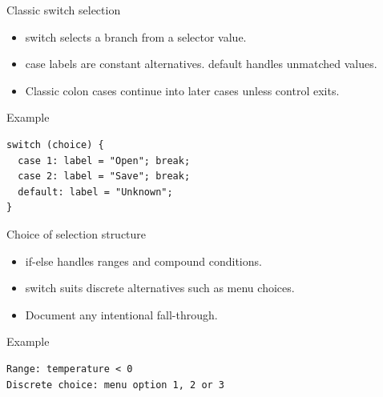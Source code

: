 \documentclass[10pt,aspectratio=169]{beamer}
\begin{document}
\begin{frame}[fragile,t]{Classic switch selection}
\begin{itemize}
\item switch selects a branch from a selector value.
\item case labels are constant alternatives. default handles unmatched values.
\item Classic colon cases continue into later cases unless control exits.
\end{itemize}
\vspace{1mm}\begin{block}{Example}
\begin{lstlisting}
switch (choice) {
  case 1: label = "Open"; break;
  case 2: label = "Save"; break;
  default: label = "Unknown";
}
\end{lstlisting}
\end{block}
\end{frame}

\begin{frame}[fragile,t]{Choice of selection structure}
\begin{itemize}
\item if-else handles ranges and compound conditions.
\item switch suits discrete alternatives such as menu choices.
\item Document any intentional fall-through.
\end{itemize}
\vspace{1mm}\begin{block}{Example}
\begin{lstlisting}
Range: temperature < 0
Discrete choice: menu option 1, 2 or 3
\end{lstlisting}
\end{block}
\end{frame}
\end{document}
